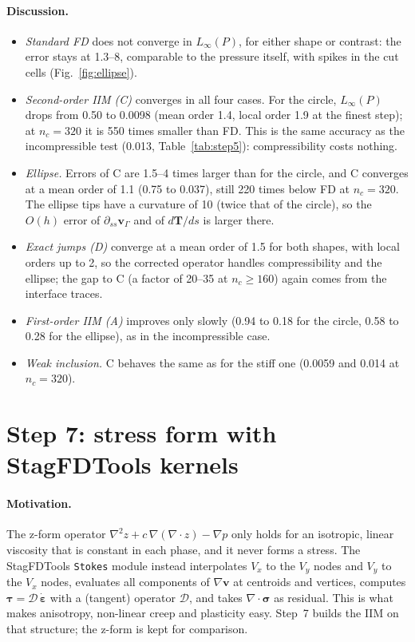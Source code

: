 \documentclass[11pt,a4paper]{article}
\newcommand{\code}[1]{\texttt{#1}}
\begin{document}
\paragraph{Discussion.}
\begin{itemize}
  \item \emph{Standard FD} does not converge in $L_\infty(P)$, for either shape or contrast: the
    error stays at 1.3--8, comparable to the pressure itself, with spikes in the cut cells
    (Fig.~\ref{fig:ellipse}).
  \item \emph{Second-order IIM (C)} converges in all four cases. For the circle, $L_\infty(P)$
    drops from 0.50 to 0.0098 (mean order 1.4, local order 1.9 at the finest step); at
    $n_c=320$ it is 550 times smaller than FD. This is the same accuracy as the incompressible
    test (0.013, Table~\ref{tab:step5}): compressibility costs nothing.
  \item \emph{Ellipse.} Errors of C are 1.5--4 times larger than for the circle, and C converges
    at a mean order of 1.1 (0.75 to 0.037), still 220 times below FD at $n_c=320$. The ellipse
    tips have a curvature of 10 (twice that of the circle), so the $O(h)$ error of
    $\partial_{ss}\mathbf v_\Gamma$ and of $d\mathbf T/ds$ is larger there.
  \item \emph{Exact jumps (D)} converge at a mean order of 1.5 for both shapes, with local
    orders up to 2, so the corrected operator handles compressibility and the ellipse; the gap
    to C (a factor of 20--35 at $n_c\ge160$) again comes from the interface traces.
  \item \emph{First-order IIM (A)} improves only slowly (0.94 to 0.18 for the circle, 0.58 to
    0.28 for the ellipse), as in the incompressible case.
  \item \emph{Weak inclusion.} C behaves the same as for the stiff one (0.0059 and 0.014 at
    $n_c=320$).
\end{itemize}

\section{Step 7: stress form with StagFDTools kernels}\label{sec:s7}

\paragraph{Motivation.} The z-form operator $\nabla^2z+c\,\nabla(\nabla\cdot z)-\nabla p$ only holds
for an isotropic, linear viscosity that is constant in each phase, and it never forms a stress.
The StagFDTools \code{Stokes} module instead interpolates $V_x$ to the $V_y$ nodes and $V_y$ to
the $V_x$ nodes, evaluates all components of $\nabla\mathbf v$ at centroids and vertices,
computes $\boldsymbol\tau=\mathcal D\,\dot{\boldsymbol\varepsilon}$ with a (tangent) operator
$\mathcal D$, and takes $\nabla\cdot\boldsymbol\sigma$ as residual. This is what makes
anisotropy, non-linear creep and plasticity easy. Step~7 builds the IIM on that structure; the
z-form is kept for comparison.
\end{document}
